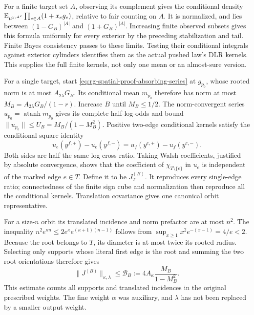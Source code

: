 For a finite target set \(A\), observing its complement gives the
conditional density
\(\mathbb E_{\mu^{y,A^c}}\prod_{e\in A}(1+x_eg_e)\), relative to fair
counting on \(A\). It is normalized, and lies between
\((1-G_B)^{|A|}\) and \((1+G_B)^{|A|}\). Increasing finite observed
subsets gives this formula uniformly for every exterior by the preceding
stabilization and tail. Finite Bayes consistency passes to these limits.
Testing their conditional integrals against exterior cylinders identifies
them as the actual pushed law's DLR kernels. This supplies the full finite
kernels, not only one mean or an almost-sure version.

For a single target, start \cref{eq:rg-spatial-proof-absorbing-series} at
\(g_{p_0}\), whose rooted norm is at most \(A_{2\lambda}G_B\). Its
conditional mean \(m_{p_0}\) therefore has norm at most
\(M_B=A_{2\lambda}G_B/(1-r)\). Increase \(B\) until \(M_B\le1/2\).
The norm-convergent series
\(u_{p_0}=\operatorname{atanh}m_{p_0}\) gives its complete half-log-odds
and bound \(\|u_{p_0}\|\le U_B=M_B/(1-M_B^2)\). Positive two-edge
conditional kernels satisfy the conditional square identity
\begin{equation}
 u_e(y^{f,+})-u_e(y^{f,-})
 =u_f(y^{e,+})-u_f(y^{e,-}).
 \label{eq:rg-spatial-proof-conditional-square}
\end{equation}
Both sides are half the same log cross ratio. Taking Walsh coefficients,
justified by absolute convergence, shows that the coefficient of
\(\chi_{T\setminus\{e\}}\) in \(u_e\) is independent of the marked
edge \(e\in T\). Define it to be \(J_T^{(B)}\). It reproduces every
single-edge ratio; connectedness of the finite sign cube and normalization
then reproduce all the conditional kernels. Translation covariance gives
one canonical orbit representative.

For a size-\(n\) orbit its translated incidence and norm prefactor are at
most \(n^2\). The inequality
\(n^2e^{\kappa n}\le2e^\kappa e^{(\kappa+1)(n-1)}\) follows from
\(\sup_{x\ge1}x^2e^{-(x-1)}=4/e<2\). Because the root belongs to
\(T\), its diameter is at most twice its rooted radius. Selecting only
supports whose literal first edge is the root and summing the two root
orientations therefore gives
\begin{equation}
 \|J^{(B)}\|_{\kappa,\lambda}
 \le\mathcal B_B:=4A_\kappa\frac{M_B}{1-M_B^2}.
 \label{eq:rg-spatial-proof-basin-norm}
\end{equation}
This estimate counts all supports and translated incidences in the
original prescribed weights. The fine weight \(\alpha\) was auxiliary,
and \(\lambda\) has not been replaced by a smaller output weight.

